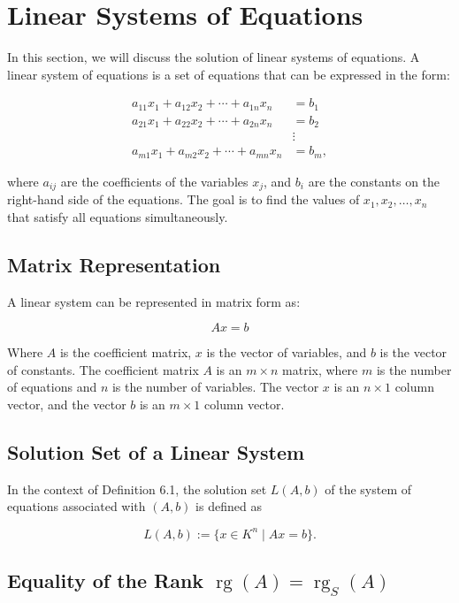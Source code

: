\newpage
\section{Linear Systems of Equations}

In this section, we will discuss the solution of linear systems of equations. A linear system of 
equations is a set of equations that can be expressed in the form:

\begin{align*}
	a_{11}x_1 + a_{12}x_2 + \cdots + a_{1n}x_n & = b_1  \\
	a_{21}x_1 + a_{22}x_2 + \cdots + a_{2n}x_n & = b_2  \\
	& \vdots \\
	a_{m1}x_1 + a_{m2}x_2 + \cdots + a_{mn}x_n & = b_m,
\end{align*}

where \( a_{ij} \) are the coefficients of the variables \( x_j \), and \( b_i \) are the constants 
on the right-hand side of the equations. The goal is to find the values of \( x_1, x_2, \ldots, x_n \) 
that satisfy all equations simultaneously.

\subsection{Matrix Representation}

A linear system can be represented in matrix form as:

\[
	A x = b
\]

Where \(A\) is the coefficient matrix, \(x\) is the vector of variables, and \(b\) is the vector 
of constants. The coefficient matrix \(A\) is an \( m \times n \) matrix, where \( m \) is the number 
of equations and \(n\) is the number of variables. The vector \(x\) is an \( n \times 1 \) column 
vector, and the vector \(b\) is an \( m \times 1 \) column vector. 

\subsection{Solution Set of a Linear System}

In the context of Definition 6.1, the solution set \( L(A, b) \) of the system of equations associated 
with \( (A, b) \) is defined as

\[
	L(A, b) := \{ x \in K^n \mid Ax = b \}.
\]

\subsection{Equality of the Rank \texorpdfstring{\(\operatorname{rg}(A) = \operatorname{rg}_S(A)\)}{}}

